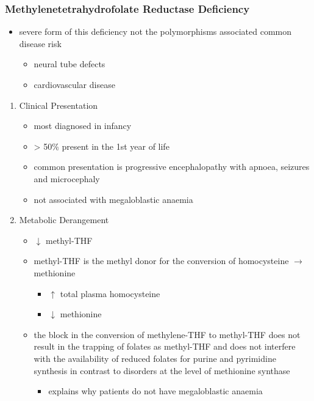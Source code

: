\documentclass{scrartcl}
\begin{document}
\subsubsection{Methylenetetrahydrofolate Reductase Deficiency}
\label{sec:orge435f24}
\begin{itemize}
\item severe form of this deficiency not the polymorphisms associated
common disease risk
\begin{itemize}
\item neural tube defects
\item cardiovascular disease
\end{itemize}
\end{itemize}
\begin{enumerate}
\item Clinical Presentation
\label{sec:orgb9dd003}
\begin{itemize}
\item most diagnosed in infancy
\item \textgreater{} 50\% present in the 1st year of life
\item common presentation is progressive encephalopathy with apnoea,
seizures and microcephaly
\item not associated with megaloblastic anaemia
\end{itemize}

\item Metabolic Derangement
\label{sec:org7bbd3e6}
\begin{itemize}
\item \(\downarrow\) methyl-THF
\item methyl-THF is the methyl donor for the conversion of homocysteine \(\to\) methionine
\begin{itemize}
\item \(\uparrow\) total plasma homocysteine
\item \(\downarrow\) methionine
\end{itemize}
\item the block in the conversion of methylene-THF to methyl-THF does not
result in the trapping of folates as methyl-THF and does not
interfere with the availability of reduced folates for purine and
pyrimidine synthesis in contrast to disorders at the level of
methionine synthase
\begin{itemize}
\item explains why patients do not have megaloblastic anaemia
\end{itemize}
\end{itemize}


\end{enumerate}
\end{document}
